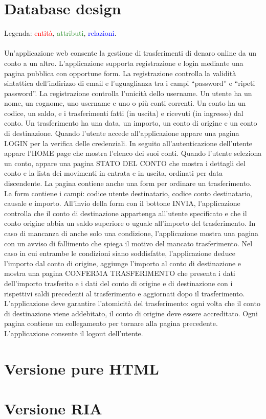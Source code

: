 \documentclass{article}
\begin{document}
	\section{Database design}
	Legenda: \textcolor{red}{entità}, \textcolor{ForestGreen}{attributi}, \textcolor{blue}{relazioni}.
	\\
	\\
	Un’applicazione web consente la gestione di trasferimenti di denaro online da un conto a un
	altro. L’applicazione supporta registrazione e login mediante una pagina pubblica con
	opportune form. La registrazione controlla la validità sintattica dell’indirizzo di email e
	l’uguaglianza tra i campi “password” e “ripeti password”. La registrazione controlla l’unicità
	dello username. Un utente ha un nome, un cognome, uno username e uno o più conti correnti.
	Un conto ha un codice, un saldo, e i trasferimenti fatti (in uscita) e ricevuti (in ingresso) dal
	conto. Un trasferimento ha una data, un importo, un conto di origine e un conto di destinazione.
	Quando l’utente accede all’applicazione appare una pagina LOGIN per la verifica delle
	credenziali. In seguito all’autenticazione dell’utente appare l’HOME page che mostra l’elenco
	dei suoi conti. Quando l’utente seleziona un conto, appare una pagina STATO DEL CONTO
	che mostra i dettagli del conto e la lista dei movimenti in entrata e in uscita, ordinati per data
	discendente. La pagina contiene anche una form per ordinare un trasferimento. La form
	contiene i campi: codice utente destinatario, codice conto destinatario, causale e importo.
	All’invio della form con il bottone INVIA, l’applicazione controlla che il conto di destinazione
	appartenga all’utente specificato e che il conto origine abbia un saldo superiore o uguale
	all’importo del trasferimento. In caso di mancanza di anche solo una condizione, l’applicazione
	mostra una pagina con un avviso di fallimento che spiega il motivo del mancato trasferimento.
	Nel caso in cui entrambe le condizioni siano soddisfatte, l’applicazione deduce l’importo dal
	conto di origine, aggiunge l’importo al conto di destinazione e mostra una pagina CONFERMA
	TRASFERIMENTO che presenta i dati dell’importo trasferito e i dati del conto di origine e di
	destinazione con i rispettivi saldi precedenti al trasferimento e aggiornati dopo il trasferimento.
	L’applicazione deve garantire l’atomicità del trasferimento: ogni volta che il conto di
	destinazione viene addebitato, il conto di origine deve essere accreditato. Ogni pagina
	contiene un collegamento per tornare alla pagina precedente. L’applicazione consente il
	logout dell’utente.
	
	\section{Versione pure HTML}
	
	\section{Versione RIA}
	
	
\end{document}
